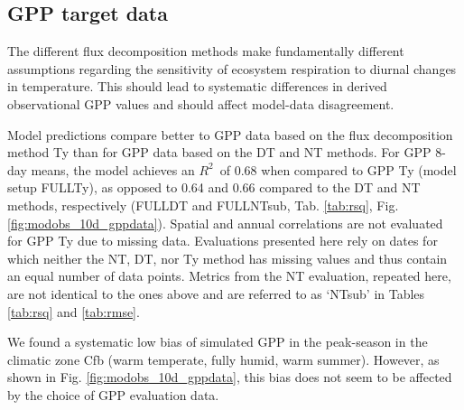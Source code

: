 \documentclass[gmd, manuscript]{copernicus}
\newcommand{\rsq}{$R^2$}
\begin{document}
\subsection{GPP target data}
\label{sec:results_gppdata}

The different flux decomposition methods make fundamentally different assumptions regarding the sensitivity of ecosystem respiration to diurnal changes in temperature. This should lead to systematic differences in derived observational GPP values and should affect model-data disagreement.

Model predictions compare better to GPP data based on the flux decomposition method Ty \citep{wang17natpl} than for GPP data based on the DT and NT methods. For GPP  8-day means, the model achieves an \rsq\ of 0.68 when compared to GPP Ty (model setup FULL\textunderscore Ty), as opposed to 0.64 and 0.66 compared to the DT and NT methods, respectively (FULL\textunderscore DT and FULL\textunderscore NTsub, Tab. \ref{tab:rsq}, Fig. \ref{fig:modobs_10d_gppdata}). Spatial and annual correlations are not evaluated for GPP Ty due to missing data. Evaluations presented here rely on dates for which neither the NT, DT, nor Ty method has missing values and thus contain an equal number of data points. Metrics from the NT evaluation, repeated here, are not identical to the ones above and are referred to as `NTsub' in Tables \ref{tab:rsq} and \ref{tab:rmse}. 
 
We found a systematic low bias of simulated GPP in the peak-season in the climatic zone Cfb (warm temperate, fully humid, warm summer). However, as shown in Fig. \ref{fig:modobs_10d_gppdata}, this bias does not seem to be affected by the choice of GPP evaluation data.
\end{document}
